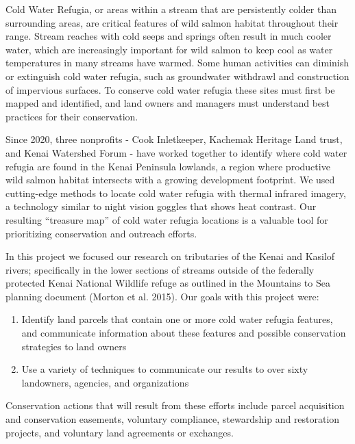 \documentclass[
  letterpaper,
  DIV=11,
  numbers=noendperiod]{scrreprt}
\begin{document}

Cold Water Refugia, or areas within a stream that are persistently
colder than surrounding areas, are critical features of wild salmon
habitat throughout their range. Stream reaches with cold seeps and
springs often result in much cooler water, which are increasingly
important for wild salmon to keep cool as water temperatures in many
streams have warmed. Some human activities can diminish or extinguish
cold water refugia, such as groundwater withdrawl and construction of
impervious surfaces. To conserve cold water refugia these sites must
first be mapped and identified, and land owners and managers must
understand best practices for their conservation.

Since 2020, three nonprofits - Cook Inletkeeper, Kachemak Heritage Land
trust, and Kenai Watershed Forum - have worked together to identify
where cold water refugia are found in the Kenai Peninsula lowlands, a
region where productive wild salmon habitat intersects with a growing
development footprint. We used cutting-edge methods to locate cold water
refugia with thermal infrared imagery, a technology similar to night
vision goggles that shows heat contrast. Our resulting ``treasure map''
of cold water refugia locations is a valuable tool for prioritizing
conservation and outreach efforts.

In this project we focused our research on tributaries of the Kenai and
Kasilof rivers; specifically in the lower sections of streams outside of
the federally protected Kenai National Wildlife refuge as outlined in
the Mountains to Sea planning document (Morton et al. 2015). Our goals
with this project were:

\begin{enumerate}
\def\labelenumi{\arabic{enumi}.}
\item
  Identify land parcels that contain one or more cold water refugia
  features, and communicate information about these features and
  possible conservation strategies to land owners
\item
  Use a variety of techniques to communicate our results to over sixty
  landowners, agencies, and organizations
\end{enumerate}

Conservation actions that will result from these efforts include parcel
acquisition and conservation easements, voluntary compliance,
stewardship and restoration projects, and voluntary land agreements or
exchanges.
\end{document}
